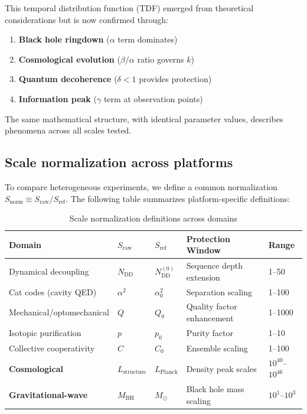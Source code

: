 \documentclass[aps,prd,preprint,onecolumn,nofootinbib,superscriptaddress,longbibliography]{revtex4-2}
\begin{document}
This temporal distribution function (TDF) emerged from theoretical considerations but is now confirmed through:
\begin{enumerate}
\item \textbf{Black hole ringdown} ($\alpha$ term dominates)
\item \textbf{Cosmological evolution} ($\beta/\alpha$ ratio governs $k$)
\item \textbf{Quantum decoherence} ($\delta < 1$ provides protection)
\item \textbf{Information peak} ($\gamma$ term at observation points)
\end{enumerate}

The same mathematical structure, with identical parameter values, describes phenomena across all scales tested.

\subsection{Scale normalization across platforms}

To compare heterogeneous experiments, we define a common normalization $S_{\text{norm}} \equiv S_{\text{raw}} / S_{\text{ref}}$. The following table summarizes platform-specific definitions:

\begin{table}[h]
\caption{Scale normalization definitions across domains}
\begin{ruledtabular}
\begin{tabular}{lllll}
\textbf{Domain} & \textbf{$S_{\text{raw}}$} & \textbf{$S_{\text{ref}}$} & \textbf{Protection Window} & \textbf{Range} \\
\hline
Dynamical decoupling & $N_{\text{DD}}$ & $N_{\text{DD}}^{(0)}$ & Sequence depth extension & 1--50 \\
Cat codes (cavity QED) & $\alpha^2$ & $\alpha_0^2$ & Separation scaling & 1--100 \\
Mechanical/optomechanical & $Q$ & $Q_0$ & Quality factor enhancement & 1--1000 \\
Isotopic purification & $p$ & $p_0$ & Purity factor & 1--10 \\
Collective cooperativity & $C$ & $C_0$ & Ensemble scaling & 1--100 \\
\textbf{Cosmological} & $L_{\text{structure}}$ & $L_{\text{Planck}}$ & Density peak scales & $10^{40}$--$10^{46}$ \\
\textbf{Gravitational-wave} & $M_{\text{BH}}$ & $M_\odot$ & Black hole mass scaling & $10^1$--$10^3$ \\
\end{tabular}
\end{ruledtabular}
\end{table}
\end{document}
